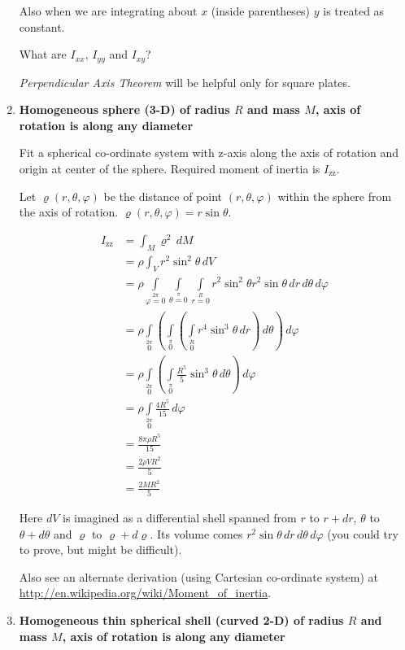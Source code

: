 \documentclass[a4paper,10pt]{article}
\begin{document}
\begin{enumerate}
Also when we are integrating about $x$ (inside parentheses) $y$ is treated as constant.

What are $I_{xx}$, $I_{yy}$ and $I_{xy}$?

\emph{Perpendicular Axis Theorem} will be helpful only for square plates.

\item \textbf{Homogeneous sphere (3-D) of radius $R$ and mass $M$, axis of rotation is along any diameter}

Fit a spherical co-ordinate system with z-axis along the axis of rotation and origin at center of the sphere. Required moment of inertia is $I_{\text{zz}}$.

Let $\varrho(r, \theta, \varphi)$ be the distance of point $(r, \theta, \varphi)$ within the sphere from the axis of rotation. $\varrho(r, \theta, \varphi) = r\sin{\theta}$.

\begin{align*}
I_\text{zz} &= \int_M \varrho^2 \,dM\\
&= \rho\int_V r^2 \sin^2{\theta} \,dV\\
&= \rho\int\limits_{\varphi=0}\limits^{2\pi}
\int\limits_{\theta=0}\limits^{\pi}
\int\limits_{r=0}\limits^{R}r^2 \sin^2{\theta}r^2 \sin{\theta} \,dr \,d\theta \,d\varphi\\
&= \rho\int\limits_0\limits^{2\pi}
\left(\int\limits_0\limits^{\pi}
\left(\int\limits_0\limits^{R}r^4 \sin^3{\theta} \,dr\right)\,d\theta\right)\,d\varphi\\
&= \rho\int\limits_0\limits^{2\pi}
\left(\int\limits_0\limits^{\pi}
\frac{R^5}{5} \sin^3{\theta} \,d\theta\right)\,d\varphi\\
&= \rho\int\limits_0\limits^{2\pi}
\frac{4R^5}{15}\,d\varphi\\
&= \frac{8\pi\rho R^5}{15}\\
&= \frac{2\rho VR^2}{5}\\
&= \frac{2MR^2}{5}
\end{align*}

Here $dV$ is imagined as a differential shell spanned from $r$ to $r+dr$, $\theta$ to $\theta+d\theta$ and $\varrho$ to $\varrho+d\varrho$. Its volume comes $r^2 \sin{\theta} \,dr \,d\theta \,d\varphi$ (you could try to prove, but might be difficult).

Also see an alternate derivation (using Cartesian co-ordinate system) at \url{http://en.wikipedia.org/wiki/Moment_of_inertia}.

\item \textbf{Homogeneous thin spherical shell (curved 2-D) of radius $R$ and mass $M$, axis of rotation is along any diameter}


\end{enumerate}
\end{document}
